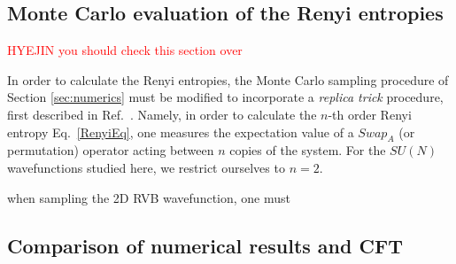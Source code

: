 \documentclass[11pt]{iopart}
\begin{document}
\subsection{Monte Carlo evaluation of the Renyi entropies}
\label{sec:su2_numerics}

\textcolor{red}{HYEJIN you should check this section over}

In order to calculate the Renyi entropies, the Monte Carlo sampling procedure of Section \ref{sec:numerics} must be modified to incorporate
a {\it replica trick} procedure, first described in Ref.~\cite{swap}.  Namely, in order to calculate the $n$-th order Renyi entropy Eq.~\ref{RenyiEq}, one measures the expectation value of a $Swap_A$ (or permutation) operator acting between $n$ copies of the system.  For the $SU(N)$ wavefunctions studied here, we restrict ourselves to $n=2$.  

when sampling the 2D RVB wavefunction, one must 

\subsection{Comparison of numerical results and CFT}
\end{document}
